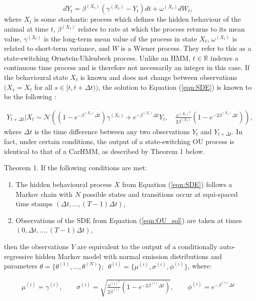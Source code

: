 \begin{equation}
    \label{eqn:SDE}
    dY_t = \beta^{(X_t)}(\gamma^{(X_t)} - Y_t)dt + \omega^{(X_t)} dW_t,
\end{equation}
%
where $X_t$ is some stochastic process which defines the hidden behaviour of the animal at time $t$, $\beta^{(X_t)}$ relates to rate at which the process returns to its mean value, $\gamma^{(X_t)}$ is the long-term mean value of the process in state $X_t$, $\omega^{(X_t)}$ is related to short-term variance, and $W$ is a Wiener process. They refer to this as a state-switching Ornstein-Uhlenbeck process. Unlike an HMM, $t \in \mathbb{R}$ indexes a continuous time process and is therefore not necessarily an integer in this case. If the behavioural state $X_t$ is known and does not change between observations $\Big(X_s = X_t$ for all $s \in [t,t+\Delta t)\Big)$, the solution to Equation (\ref{eqn:SDE}) is known to be the following \citep{Michelot:2019}:

\begin{align}
    Y_{t+\Delta t} | X_{t} \sim \mathcal{N}\left((1-e^{-\beta^{(X_t)}\Delta t})\gamma^{(X_t)} + e^{-\beta^{(X_t)}\Delta t} Y_t,\quad \frac{\omega^{(X_t)^2}}{2\beta^{(X_t)}} (1-e^{-2\beta^{(X_t)}\Delta t})\right),
    \label{eqn:OU_sol}
\end{align}
%
where $\Delta t$ is the time difference between any two observations $Y_t$ and $Y_{t+\Delta t}$. In fact, under certain conditions, the output of a state-switching OU process is identical to that of a CarHMM, as described by Theorem 1 below.

\begin{theorem}{Theorem 1.}{}%
If the following conditions are met:
\begin{enumerate}
    \item The hidden behavioural process $X$ from Equation (\ref{eqn:SDE}) follows a Markov chain with $N$ possible states and transitions occur at equi-spaced time stamps $\left(\Delta t, \ldots, (T-1)\Delta t\right)$,
    
    \item Observations of the SDE from Equation (\ref{eqn:OU_sol}) are taken at times $\left(0, \Delta t, \ldots, (T-1)\Delta t\right)$,
\end{enumerate}
then the observations $Y$ are equivalent to the output of a conditionally auto-regressive hidden Markov model with normal emission distributions and parameters $\theta = \{\theta^{(1)}, \ldots, \theta^{(N)}\}; \enspace \theta^{(i)} = \{\mu^{(i)},\sigma^{(i)},\phi^{(i)}\}$, where:

\begin{align}
\mu^{(i)} = \gamma^{(i)}, \qquad \sigma^{(i)} = \sqrt{\frac{\omega^{(i)^2}}{2\beta^{(i)}} (1-e^{-2\beta^{(i)}\Delta t})}, \qquad \phi^{(i)} = e^{-\beta^{(i)}\Delta t} \label{eqn:CarHMM_to_OU}
\end{align}

\end{theorem}

